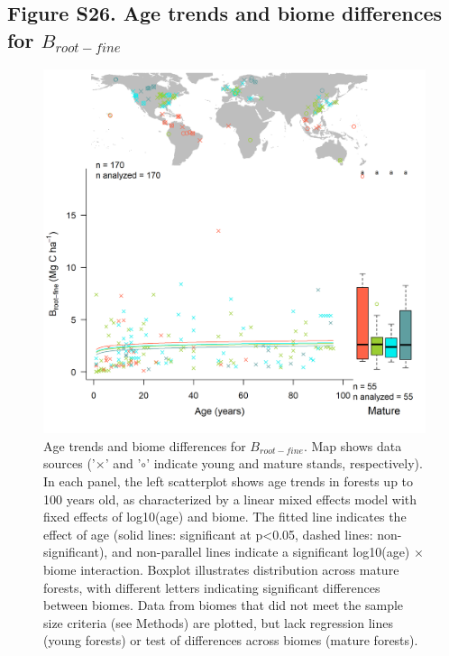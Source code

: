 \documentclass[
]{article}
\begin{document}
\newpage

\hypertarget{figure-s26.-age-trends-and-biome-differences-for-b_root-fine}{%
\subsection{\texorpdfstring{Figure S26. Age trends and biome differences
for
\(B_{root-fine}\)}{Figure S26. Age trends and biome differences for B\_\{root-fine\}}}\label{figure-s26.-age-trends-and-biome-differences-for-b_root-fine}}

\begin{figure}[H]

{\centering \includegraphics[width=1\linewidth]{tables_figures/age_trends/biomass_root_fine_with_map} 

}

\caption{Age trends and biome differences for $B_{root-fine}$. Map shows data sources ('$\times$' and '$\circ$' indicate young and mature stands, respectively). In each panel, the left scatterplot shows age trends in forests up to 100 years old, as characterized by a linear mixed effects model with fixed effects of log10(age) and biome. The fitted line indicates the effect of age (solid lines: significant at p<0.05, dashed lines: non-significant), and non-parallel lines indicate a significant log10(age) $\times$ biome interaction. Boxplot illustrates distribution across mature forests, with different letters indicating significant differences between biomes. Data from biomes that did not meet the sample size criteria (see Methods) are plotted, but lack regression lines (young forests) or test of differences across biomes (mature forests).}\label{fig:unnamed-chunk-29}
\end{figure}
\end{document}
